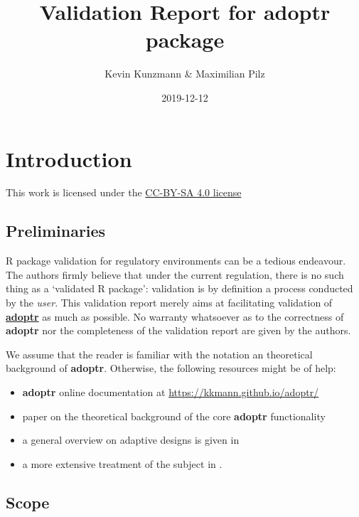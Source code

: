 \documentclass[]{book}
\title{Validation Report for \textbf{adoptr} package}
\author{Kevin Kunzmann \& Maximilian Pilz}
\date{2019-12-12}
\providecommand{\tightlist}{%
  \setlength{\itemsep}{0pt}\setlength{\parskip}{0pt}}
\begin{document}
\maketitle

{
\setcounter{tocdepth}{1}
\tableofcontents
}
\hypertarget{introduction}{%
\chapter{Introduction}\label{introduction}}

This work is licensed under the \href{https://creativecommons.org/licenses/by-sa/4.0/deed.en}{CC-BY-SA 4.0 license}

\hypertarget{preliminaries}{%
\section{Preliminaries}\label{preliminaries}}

R package validation for regulatory environments can be a
tedious endeavour.
The authors firmly believe that under the current regulation,
there is no such thing as a `validated R package':
validation is by definition a process conducted by the \emph{user}.
This validation report merely aims at facilitating
validation of \textbf{\href{https://github.com/kkmann/adoptr}{adoptr}} as
much as possible.
No warranty whatsoever as to the correctness of \textbf{adoptr} nor the
completeness of the validation report are given by the authors.

We assume that the reader is familiar with the notation an theoretical
background of \textbf{adoptr}.
Otherwise, the following resources might be of help:

\begin{itemize}
\tightlist
\item
  \textbf{adoptr} online documentation at \url{https://kkmann.github.io/adoptr/}
\item
  paper on the theoretical background of the core \textbf{adoptr} functionality \citep{variational}
\item
  a general overview on adaptive designs is given in \citep{Bauer2015}
\item
  a more extensive treatment of the subject in \citep{Wassmer2016}.
\end{itemize}

\hypertarget{scope}{%
\section{Scope}\label{scope}}
\end{document}
